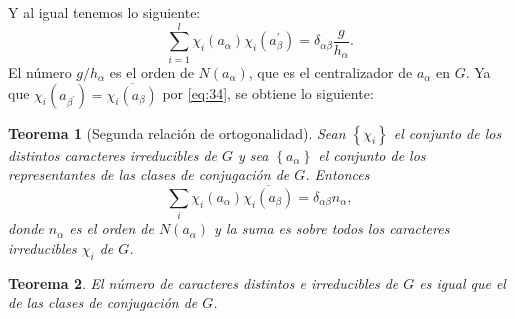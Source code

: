 \documentclass[12pt]{book}
\newtheorem{theorem}{Teorema}[section]
\theoremstyle{definition}
\newcounter{in}
\begin{document}
Y al igual tenemos lo siguiente:
\begin{equation}
  \label{eq:55}
   \sum_{i=1}^{l} \chi_{i}(a_{\alpha}) \chi_{i}(a_{\beta}^{'})=\delta_{\alpha \beta} \frac{g}{h_{\alpha}}.
\end{equation}
El número $g/h_{\alpha}$ es el orden de $N(a_{\alpha})$, que es el
centralizador de $a_{\alpha}$ en $G$. Ya que
$\chi_{i}(a_{\beta^{'}})=\overline{\chi_{i} (a_{\beta})}$ por
\ref{eq:34}, se obtiene lo siguiente:
\begin{theorem}[Segunda relación de ortogonalidad]
  \label{t4_9}
  Sean $\left\{\chi_{i} \right\}$ el conjunto de los distintos
  caracteres irreducibles de $G$ y sea $\left\{a_{\alpha} \right\}$ el
  conjunto de los representantes de las clases de conjugación de
  $G$. Entonces
\begin{equation*}
  \sum_{i} \chi_{i}(a_{\alpha}) \overline{\chi_{i} (a_{\beta})} = \delta_{\alpha \beta} n_{\alpha},
\end{equation*}
donde $n_{\alpha}$ es el orden de $N(a_{\alpha})$ y la suma es sobre
todos los caracteres irreducibles $\chi_{i}$ de $G$.
\end{theorem}
\begin{theorem}
  \label{t4_10}
  El número de caracteres distintos e irreducibles de $G$ es
  igual que el de las clases de conjugación de $G$.
\end{theorem}
\end{document}
